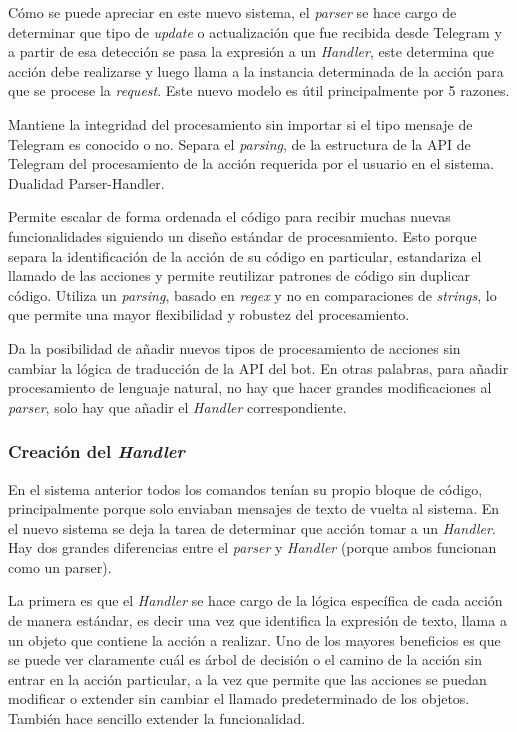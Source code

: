     \par Cómo se puede apreciar en este nuevo sistema, el \textit{parser} se hace cargo de determinar que tipo de \textit{update} o actualización que fue recibida desde \gls{Telegram} y a partir de esa detección se pasa la expresión a un \textit{Handler}, este determina que acción debe realizarse y luego llama a la instancia determinada de la acción para que se procese la \textit{request}. Este nuevo modelo es útil principalmente por 5 razones.
    
    \par Mantiene la integridad del procesamiento sin importar si el tipo mensaje de \gls{Telegram} es conocido o no.
    Separa el  \textit{parsing}, de la estructura de la API de \gls{Telegram} del procesamiento de la acción requerida por el usuario en el sistema. Dualidad Parser-Handler.

    \par Permite escalar de forma ordenada el código para recibir muchas nuevas funcionalidades siguiendo un diseño estándar de procesamiento. Esto porque separa la identificación de la acción de su código en particular, estandariza el llamado de las acciones y permite reutilizar patrones de código sin duplicar código. 
    Utiliza un  \textit{parsing}, basado en \textit{regex} y no en comparaciones de \textit{strings}, lo que permite una mayor flexibilidad y robustez del procesamiento.
    \par Da la posibilidad de añadir nuevos tipos de procesamiento de acciones sin cambiar la lógica  de traducción de la API del bot. En otras palabras, para añadir procesamiento de lenguaje natural, no hay que hacer grandes modificaciones al \textit{parser}, solo hay que añadir el \textit{Handler} correspondiente.

    \subsubsection{Creación del \textit{Handler}}
        \par En el sistema anterior todos los comandos tenían su propio bloque de código, principalmente porque solo enviaban mensajes de texto de vuelta al sistema. En el nuevo sistema se deja la tarea de determinar que acción tomar a un \textit{Handler}. Hay dos grandes diferencias entre el \textit{parser} y \textit{Handler} (porque ambos funcionan como un parser).
        
        \par La primera es que el \textit{Handler} se hace cargo de la lógica específica de cada acción de manera estándar, es decir una vez que identifica la expresión de texto, llama a un objeto que contiene la acción a realizar. Uno de los mayores beneficios es que se puede ver claramente cuál es árbol de decisión o el camino de la acción sin entrar en la acción particular, a la vez que permite que las acciones se puedan modificar o extender sin cambiar el llamado predeterminado de los objetos. También hace sencillo extender la funcionalidad. 
        
